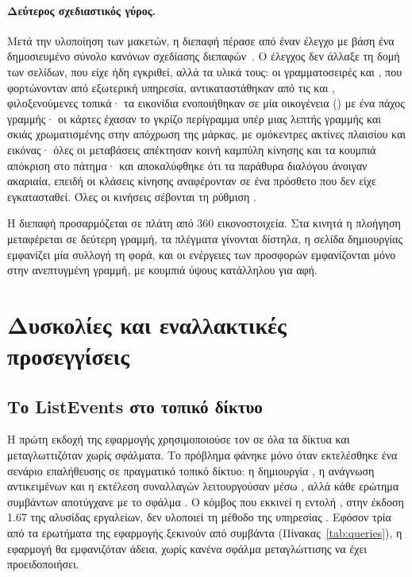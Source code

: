 \paragraph{Δεύτερος σχεδιαστικός γύρος.} Μετά την υλοποίηση των μακετών, η διεπαφή
πέρασε από έναν έλεγχο με βάση ένα δημοσιευμένο σύνολο κανόνων σχεδίασης
διεπαφών~\cite{taste-skill}. Ο έλεγχος δεν άλλαξε τη δομή των σελίδων, που είχε ήδη
εγκριθεί, αλλά τα υλικά τους: οι γραμματοσειρές  και , που
φορτώνονταν από εξωτερική υπηρεσία, αντικαταστάθηκαν από τις  και
, φιλοξενούμενες τοπικά· τα εικονίδια ενοποιήθηκαν σε μία οικογένεια
() με ένα πάχος γραμμής· οι κάρτες έχασαν το γκρίζο περίγραμμα υπέρ μιας
λεπτής γραμμής και σκιάς χρωματισμένης στην απόχρωση της μάρκας, με ομόκεντρες ακτίνες
πλαισίου και εικόνας· όλες οι μεταβάσεις απέκτησαν κοινή καμπύλη κίνησης και τα κουμπιά
απόκριση στο πάτημα· και αποκαλύφθηκε ότι τα παράθυρα διαλόγου άνοιγαν ακαριαία, επειδή
οι κλάσεις κίνησης αναφέρονταν σε ένα πρόσθετο που δεν είχε εγκατασταθεί. Όλες οι
κινήσεις σέβονται τη ρύθμιση .

Η διεπαφή προσαρμόζεται σε πλάτη από 360 εικονοστοιχεία. Στα κινητά η πλοήγηση μεταφέρεται
σε δεύτερη γραμμή, τα πλέγματα γίνονται δίστηλα, η σελίδα δημιουργίας εμφανίζει μία
συλλογή τη φορά, και οι ενέργειες των προσφορών εμφανίζονται μόνο στην ανεπτυγμένη γραμμή,
με κουμπιά ύψους κατάλληλου για αφή.

\section{Δυσκολίες και εναλλακτικές προσεγγίσεις}
\label{sec:difficulties}

\subsection{Το ListEvents στο τοπικό δίκτυο}
\label{sec:listevents}

Η πρώτη εκδοχή της εφαρμογής χρησιμοποιούσε τον  σε όλα τα δίκτυα και
μεταγλωττιζόταν χωρίς σφάλματα. Το πρόβλημα φάνηκε μόνο όταν εκτελέσθηκε ένα σενάριο επαλήθευσης σε
πραγματικό τοπικό δίκτυο: η δημιουργία , η ανάγνωση αντικειμένων και η εκτέλεση
συναλλαγών λειτουργούσαν μέσω , αλλά κάθε ερώτημα συμβάντων αποτύγχανε με το
σφάλμα . Ο κόμβος που εκκινεί η εντολή , στην έκδοση
1.67 της αλυσίδας εργαλείων, δεν υλοποιεί τη μέθοδο  της υπηρεσίας
. Εφόσον
τρία από τα ερωτήματα της εφαρμογής ξεκινούν από συμβάντα (Πίνακας~\ref{tab:queries}), η
εφαρμογή θα εμφανιζόταν άδεια, χωρίς κανένα σφάλμα μεταγλώττισης να έχει προειδοποιήσει.

